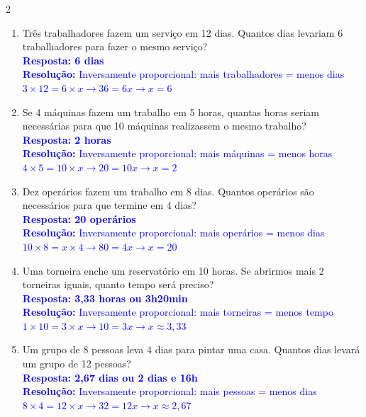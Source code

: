 \documentclass[11pt]{article}
\begin{document}
\begin{multicols}{2}
\begin{enumerate}[leftmargin=*, itemsep=2pt]
\item Três trabalhadores fazem um serviço em 12 dias. Quantos dias levariam 6 trabalhadores para fazer o mesmo serviço? \\
\textcolor{blue}{\textbf{Resposta: 6 dias}} \\
\textcolor{blue}{\textbf{Resolução:} Inversamente proporcional: mais trabalhadores = menos dias} \\
\textcolor{blue}{$3 \times 12 = 6 \times x \rightarrow 36 = 6x \rightarrow x = 6$}

\item Se 4 máquinas fazem um trabalho em 5 horas, quantas horas seriam necessárias para que 10 máquinas realizassem o mesmo trabalho? \\
\textcolor{blue}{\textbf{Resposta: 2 horas}} \\
\textcolor{blue}{\textbf{Resolução:} Inversamente proporcional: mais máquinas = menos horas} \\
\textcolor{blue}{$4 \times 5 = 10 \times x \rightarrow 20 = 10x \rightarrow x = 2$}

\item Dez operários fazem um trabalho em 8 dias. Quantos operários são necessários para que termine em 4 dias? \\
\textcolor{blue}{\textbf{Resposta: 20 operários}} \\
\textcolor{blue}{\textbf{Resolução:} Inversamente proporcional: mais operários = menos dias} \\
\textcolor{blue}{$10 \times 8 = x \times 4 \rightarrow 80 = 4x \rightarrow x = 20$}

\item Uma torneira enche um reservatório em 10 horas. Se abrirmos mais 2 torneiras iguais, quanto tempo será preciso? \\
\textcolor{blue}{\textbf{Resposta: 3,33 horas ou 3h20min}} \\
\textcolor{blue}{\textbf{Resolução:} Inversamente proporcional: mais torneiras = menos tempo} \\
\textcolor{blue}{$1 \times 10 = 3 \times x \rightarrow 10 = 3x \rightarrow x \approx 3,33$}

\item Um grupo de 8 pessoas leva 4 dias para pintar uma casa. Quantos dias levará um grupo de 12 pessoas? \\
\textcolor{blue}{\textbf{Resposta: 2,67 dias ou 2 dias e 16h}} \\
\textcolor{blue}{\textbf{Resolução:} Inversamente proporcional: mais pessoas = menos dias} \\
\textcolor{blue}{$8 \times 4 = 12 \times x \rightarrow 32 = 12x \rightarrow x \approx 2,67$}


\end{enumerate}
\end{multicols}
\end{document}
